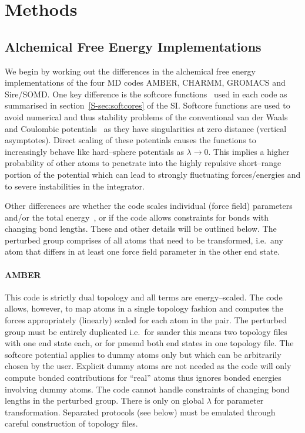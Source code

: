 \documentclass[journal=jctcce,manuscript=article]{achemso}
\begin{document}
\section{Methods}
\label{sec:methods}

\subsection{Alchemical Free Energy Implementations}
\label{sec:afe_impl}

We begin by working out the differences in the alchemical free energy
implementations of the four MD codes AMBER, CHARMM, GROMACS and
Sire/SOMD.  One key difference is the softcore
functions~\cite{beutler_avoiding_1994,
  zacharias_separationshifted_1994} used in each code as summarised in
section~\ref{S-sec:softcores} of the SI.  Softcore functions are used to avoid numerical and thus
stability problems of the conventional van der Waals and Coulombic
potentials~\cite{steinbrecher_nonlinear_2007} as they have
singularities at zero distance (vertical asymptotes).  Direct scaling
of these potentials causes the functions to increasingly behave like
hard--sphere potentials as $\lambda\rightarrow 0$.  This implies a
higher probability of other atoms to penetrate into the highly
repulsive short--range portion of the potential which can lead to
strongly fluctuating forces/energies and to severe instabilities in
the integrator.

Other differences are whether the code scales individual (force field)
parameters and/or the total energy~\cite{doi:10.1021/jp981628n}, or if
the code allows constraints for bonds with changing bond lengths.
These and other details will be outlined below.  The perturbed group
comprises of all atoms that need to be transformed, i.e.\ any atom
that differs in at least one force field parameter in the other end
state.

\paragraph{AMBER} This code is strictly dual topology and all terms
are energy--scaled.  The code allows, however, to map atoms in a
single topology fashion and computes the forces appropriately
(linearly) scaled for each atom in the pair.  The perturbed group must
be entirely duplicated i.e.\ for sander this means two topology files
with one end state each, or for pmemd both end states in one topology
file.  The softcore potential applies to dummy atoms only but which
can be arbitrarily chosen by the user.  Explicit dummy atoms are not
needed as the code will only compute bonded contributions for ``real''
atoms thus ignores bonded energies involving dummy atoms.  The code
cannot handle constraints of changing bond lengths in the perturbed
group.  There is only on global $\lambda$ for parameter
transformation.  Separated protocols (see below) must be emulated
through careful construction of topology files.
\end{document}

